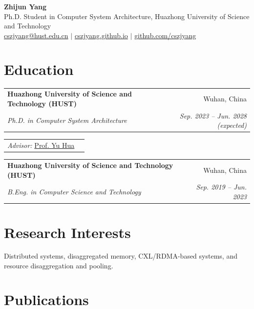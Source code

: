 \documentclass[a4paper,11pt]{article}
\makeatletter
\newcommand{\educationentry}[4]{%
  \begin{tabularx}{\textwidth}{@{}Xr@{}}
    \textbf{#1} & #2 \\
    \textit{#3} & \textit{#4}
  \end{tabularx}%
}
\newcommand{\datedentry}[2]{%
  \begin{tabular*}{\textwidth}{@{\extracolsep{\fill}}lr}
    #1 & #2
  \end{tabular*}%
}
\makeatother
\begin{document}
\begin{center}
  {\Huge\bfseries Zhijun Yang}\\[6pt]
  {\normalsize
    Ph.D. Student in Computer System Architecture,
    Huazhong University of Science and Technology
  }\\[3pt]
  {\small
    \href{mailto:cszjyang@hust.edu.cn}{cszjyang@hust.edu.cn}
    \enspace$\vert$\enspace
    \href{https://cszjyang.github.io/}{cszjyang.github.io}
    \enspace$\vert$\enspace
    \href{https://github.com/cszjyang}{github.com/cszjyang}
  }
\end{center}
\vspace{-0.55em}

\section{Education}

\educationentry
  {Huazhong University of Science and Technology (HUST)}
  {Wuhan, China}
  {Ph.D. in Computer System Architecture}
  {Sep. 2023 -- Jun. 2028 (expected)}

\vspace{0.15em}
\datedentry
  {\textit{Advisor:} \href{https://csyhua.github.io/csyhua/index.html}{Prof. Yu Hua}}
  {}

\vspace{0.30em}
\educationentry
  {Huazhong University of Science and Technology (HUST)}
  {Wuhan, China}
  {B.Eng. in Computer Science and Technology}
  {Sep. 2019 -- Jun. 2023}

\section{Research Interests}

Distributed systems, disaggregated memory, CXL/RDMA-based systems, and resource disaggregation and pooling.

\section{Publications}
\end{document}
